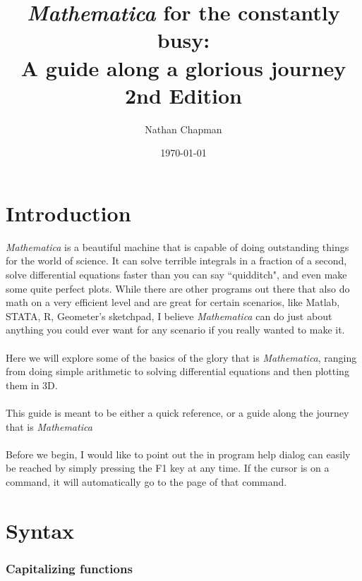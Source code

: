 \documentclass[11pt,a4paper,twoside]{article}
\author{Nathan Chapman}
\title{ \textit{Mathematica} for the constantly busy: \\ A guide along a glorious journey \\ 2nd Edition}
\date{\today}
\begin{document}
	\begin{titlepage}

		\maketitle
		
	\end{titlepage}
	
	\tableofcontents
	
	\newpage
	
	\part{Introduction}
	
		\textit{Mathematica} is a beautiful machine that is capable of doing outstanding things for the world of science.  It can solve terrible integrals in a fraction of a second, solve differential equations faster than you can say ``quidditch", and even make some quite perfect plots.  While there are other programs out there that also do math on a very efficient level and are great for certain scenarios, like Matlab, STATA, R, Geometer's sketchpad, I believe \textit{Mathematica} can do just about anything you could ever want for any scenario if you really wanted to make it.
		\\
		\\
		Here we will explore some of the basics of the glory that is \textit{Mathematica}, ranging from doing simple arithmetic to solving differential equations and then plotting them in 3D.
		\\
		\\
		This guide is meant to be either a quick reference, or a guide along the journey that is \textit{Mathematica}
		\\
		\\
		Before we begin, I would like to point out the in program help dialog can easily be reached by simply pressing the F1 key at any time.  If the cursor is on a command, it will automatically go to the page of that command.
		
\newpage

	\part{Syntax}

		\section{Capitalizing functions}
			
\end{document}
